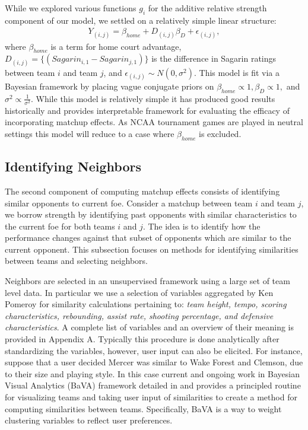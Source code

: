\documentclass[letterpaper,12pt]{article}
\begin{document}
While we explored various functions $g_i$ for the additive relative strength component of our model, we settled on a relatively simple linear structure:
\begin{eqnarray}
Y_{(i,j)} =  \beta_{home} + D_{(i,j)}\beta_D +  \epsilon_{(i,j)},
\label{eq:RS2}
\end{eqnarray}
where $\beta_{home}$ is a term for home court advantage, $D_{(i,j)}=\{(Sagarin_{i,1} - Sagarin_{j,1})\}$ is the difference in Sagarin ratings between team $i$ and team $j$, and $\epsilon_{(i,j)} \sim N(0,\sigma^2).$ This model is fit via a Bayesian framework by placing vague conjugate priors on $\beta_{home}\propto 1, \beta_D \propto 1,$ and $ \sigma^2 \propto \frac{1}{\sigma^2}$. While this model is relatively simple it has produced good results historically \citep{carlin1996} and provides interpretable framework for evaluating the efficacy of incorporating matchup effects. As NCAA tournament games are played in neutral settings this model will reduce to a case where $\beta_{home}$ is excluded.

\subsection{Identifying Neighbors}
The second component of computing matchup effects consists of identifying similar opponents to current foe. Consider a matchup between team $i$ and team $j$, we borrow strength by identifying past opponents with similar characteristics to the current foe for both teams $i$ and $j$. The idea is to identify how the performance changes against that subset of opponents which are similar to the current opponent. This subsection focuses on methods for identifying similarities between teams and selecting neighbors.

Neighbors are selected in an unsupervised framework using a large set of team level data. In particular we use a selection of variables aggregated by Ken Pomeroy \citep{kenpom.com} for similarity calculations pertaining to: \emph{team height, tempo, scoring characteristics, rebounding,  assist rate, shooting percentage, and defensive characteristics}. A complete list of variables and an overview of their meaning is provided in Appendix A. Typically this procedure is done analytically after standardizing the variables, however, user input can also be elicited. For instance, suppose that a user decided Mercer was similar to Wake Forest and Clemson, due to their size and playing style. In this case current and ongoing work in Bayesian Visual Analytics (BaVA) framework detailed in \cite{house2010}  and \cite{hu2013} provides a principled routine for visualizing teams and taking user input of similarities to create a method for computing similarities between teams. Specifically, BaVA is a way to weight clustering variables to reflect user preferences.
\end{document}
